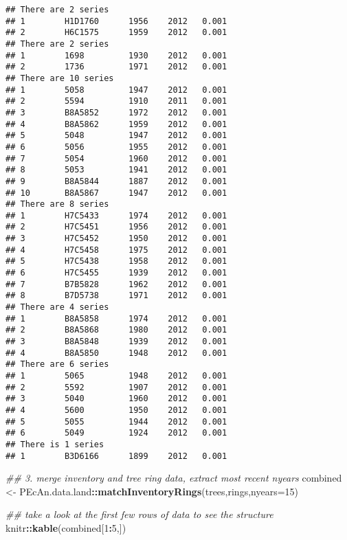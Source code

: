 \documentclass[]{article}
\newenvironment{Shaded}{\begin{snugshade}}{\end{snugshade}}
\newcommand{\CommentTok}[1]{\textcolor[rgb]{0.56,0.35,0.01}{\textit{#1}}}
\newcommand{\DataTypeTok}[1]{\textcolor[rgb]{0.13,0.29,0.53}{#1}}
\newcommand{\DecValTok}[1]{\textcolor[rgb]{0.00,0.00,0.81}{#1}}
\newcommand{\KeywordTok}[1]{\textcolor[rgb]{0.13,0.29,0.53}{\textbf{#1}}}
\newcommand{\NormalTok}[1]{#1}
\newcommand{\OperatorTok}[1]{\textcolor[rgb]{0.81,0.36,0.00}{\textbf{#1}}}
\newcommand{\StringTok}[1]{\textcolor[rgb]{0.31,0.60,0.02}{#1}}
\begin{document}
\begin{verbatim}
## There are 2 series
## 1        H1D1760      1956    2012   0.001
## 2        H6C1575      1959    2012   0.001
## There are 2 series
## 1        1698         1930    2012   0.001
## 2        1736         1971    2012   0.001
## There are 10 series
## 1        5058         1947    2012   0.001
## 2        5594         1910    2011   0.001
## 3        B8A5852      1972    2012   0.001
## 4        B8A5862      1959    2012   0.001
## 5        5048         1947    2012   0.001
## 6        5056         1955    2012   0.001
## 7        5054         1960    2012   0.001
## 8        5053         1941    2012   0.001
## 9        B8A5844      1887    2012   0.001
## 10       B8A5867      1947    2012   0.001
## There are 8 series
## 1        H7C5433      1974    2012   0.001
## 2        H7C5451      1956    2012   0.001
## 3        H7C5452      1950    2012   0.001
## 4        H7C5458      1975    2012   0.001
## 5        H7C5438      1958    2012   0.001
## 6        H7C5455      1939    2012   0.001
## 7        B7B5828      1962    2012   0.001
## 8        B7D5738      1971    2012   0.001
## There are 4 series
## 1        B8A5858      1974    2012   0.001
## 2        B8A5868      1980    2012   0.001
## 3        B8A5848      1939    2012   0.001
## 4        B8A5850      1948    2012   0.001
## There are 6 series
## 1        5065         1948    2012   0.001
## 2        5592         1907    2012   0.001
## 3        5040         1960    2012   0.001
## 4        5600         1950    2012   0.001
## 5        5055         1944    2012   0.001
## 6        5049         1924    2012   0.001
## There is 1 series
## 1        B3D6166      1899    2012   0.001
\end{verbatim}

\begin{Shaded}
\begin{Highlighting}[]
\CommentTok{## 3. merge inventory and tree ring data, extract most recent nyears}
\NormalTok{combined <-}\StringTok{ }\NormalTok{PEcAn.data.land}\OperatorTok{::}\KeywordTok{matchInventoryRings}\NormalTok{(trees,rings,}\DataTypeTok{nyears=}\DecValTok{15}\NormalTok{)}

\CommentTok{## take a look at the first few rows of data to see the structure}
\NormalTok{knitr}\OperatorTok{::}\KeywordTok{kable}\NormalTok{(combined[}\DecValTok{1}\OperatorTok{:}\DecValTok{5}\NormalTok{,])}
\end{Highlighting}
\end{Shaded}
\end{document}
